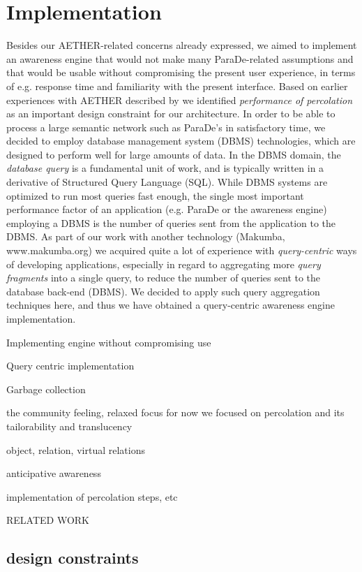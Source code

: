 \documentclass{ecscw2007}
\begin{document}
\section*{Implementation} 
Besides our AETHER-related concerns already expressed, we aimed to implement an awareness engine that would not make many ParaDe-related assumptions and that would be usable without compromising the present user experience, in terms of e.g. response time and familiarity with the present interface. Based on earlier experiences with AETHER described by \cite{sandor97} we identified \textit{performance of percolation} as an important design constraint for our architecture. In order to be able to process a large semantic network such as ParaDe's in satisfactory time, we decided to employ database management system (DBMS) technologies, which are designed to perform well for large amounts of data. In the DBMS domain, the \textit{database query} is a fundamental unit of work, and is typically written in a derivative of Structured Query Language (SQL). While DBMS systems are optimized to run most queries fast enough, the single most important performance factor of an application (e.g.  ParaDe or the awareness engine) employing a DBMS is the number of queries sent from the application to the DBMS. As part of our work with another technology (Makumba, www.makumba.org) we acquired quite a lot of experience with \textit{query-centric} ways of developing applications, especially in regard to aggregating more \textit{query fragments} into a single query, to reduce the number of queries sent to the database back-end (DBMS).  We decided to apply such query aggregation techniques here,  and thus we have obtained a query-centric awareness engine implementation. 







Implementing engine without compromising use

Query centric implementation

Garbage collection

the community feeling, relaxed focus
for now we focused on percolation and its tailorability and translucency

object, relation, virtual relations

anticipative awareness

implementation of percolation steps, etc

RELATED WORK

\subsection*{design constraints}
\end{document}
